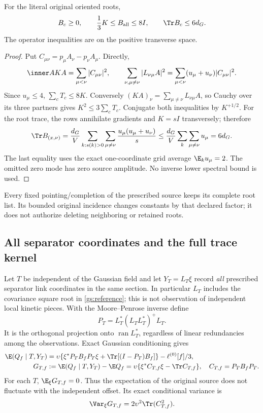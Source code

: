 \begin{lemma}
\label{gs:rootbounds}
For the literal original oriented roots,
\begin{equation}
 B_c\ge0,\qquad \frac13K\le B_{\rm all}\le8I,
 \qquad \Tr B_c\le6d_G.
 \label{gs:bounds}
\end{equation}
The operator inequalities are on the positive transverse space.
\end{lemma}
\begin{proof}
Put \(C_{\mu\nu}=p_\mu A_\nu-p_\nu A_\mu\). Directly,
\[
 \inner A{KA}=\sum_{\mu<\nu}|C_{\mu\nu}|^2,\qquad
 \sum_{\nu,\mu\ne\nu}|L_{\nu\mu}A|^2
 =\sum_{\mu<\nu}(u_\mu+u_\nu)|C_{\mu\nu}|^2.
\]
Since \(u_\mu\le4\), \(\sum_cT_c\le8K\). Conversely
\((KA)_\nu=\sum_{\mu\ne\nu}L_{\nu\mu}A\), so Cauchy over its three partners
gives \(K^2\le3\sum_cT_c\). Conjugate both inequalities by \(K^{+1/2}\).
For the root trace, the rows annihilate gradients and \(K=sI\) transversely;
therefore
\begin{equation}
 \Tr B_{(x,\nu)}
 =\frac{d_G}{V}\sum_{k:s(k)>0}\sum_{\mu\ne\nu}
       \frac{u_\mu(u_\mu+u_\nu)}s
 \le \frac{d_G}{V}\sum_k\sum_{\mu\ne\nu}u_\mu
 =6d_G.
 \label{gs:roottrace}
\end{equation}
The last equality uses the exact one-coordinate grid average \(\E_k u_\mu=2\).
The omitted zero mode has zero source amplitude. No inverse lower spectral
bound is used.
\end{proof}

Every fixed pointing/completion of the prescribed source keeps its complete
root list. Its bounded original incidence changes constants by that declared
factor; it does not authorize deleting neighboring or retained roots.

\subsection{All separator coordinates and the full trace kernel}

Let \(T\) be independent of the Gaussian field and let
\(Y_T=L_T\xi\) record \emph{all} prescribed separator link coordinates in the
same section. In particular \(L_T\) includes the covariance square root in
\eqref{gs:reference}; this is not observation of independent local kinetic
pieces. With the Moore--Penrose inverse define
\[
 P_T=L_T^*(L_TL_T^*)^+L_T.
\]
It is the orthogonal projection onto \(\operatorname{ran}L_T^*\), regardless of
linear redundancies among the observations. Exact Gaussian conditioning gives
\begin{align}
 \E(Q_f\mid T,Y_T)
 &=\upsilon\{\xi^*P_TB_fP_T\xi+\Tr[(I-P_T)B_f]\}
       -\ell^{(0)}[f]/3,\label{gs:conditional}\\
 G_{T,f}&:=\E(Q_f\mid T,Y_T)-\E Q_f
   =\upsilon\{\xi^*C_{T,f}\xi-\Tr C_{T,f}\},\quad
 C_{T,f}=P_TB_fP_T.\label{gs:centered}
\end{align}
For each \(T\), \(\E_\xi G_{T,f}=0\). Thus the expectation of the original
source does not fluctuate with the independent offset. Its exact conditional
variance is
\begin{equation}
 \Var_\xi G_{T,f}=2\upsilon^2\Tr(C_{T,f}^2).
 \label{gs:exactvariance}
\end{equation}

